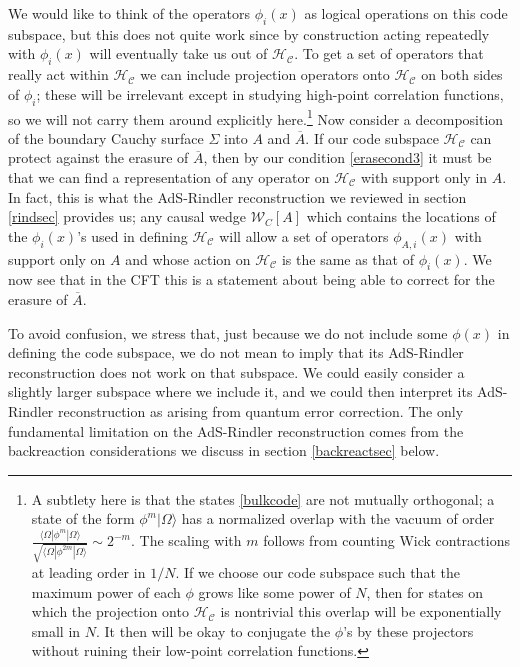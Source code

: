 \documentclass[12pt]{article}
\newcommand{\HC}{\mathcal{H}_{\mathcal{C}}}
\newcommand{\lan}{\langle}
\newcommand{\ran}{\rangle}
\newcommand{\W}{\mathcal{W}}
\newcommand{\ol}{\overline}
\begin{document}
We would like to think of the operators $\phi_i(x)$ as logical operations on this code subspace, but this does not quite work since by construction acting repeatedly with $\phi_i(x)$ will eventually take us out of $\HC$.  To get a set of operators that really act within $\HC$ we can include projection operators onto $\HC$ on both sides of $\phi_i$; these will be irrelevant except in studying high-point correlation functions, so we will not carry them around explicitly here.\footnote{A subtlety here is that the states \eqref{bulkcode} are not mutually orthogonal; a state of the form $\phi^m|\Omega\ran$ has a normalized overlap with the vacuum of order $\frac{\lan\Omega|\phi^m|\Omega\ran}{\sqrt{\lan\Omega|\phi^{2m}|\Omega\ran}}\sim 2^{-m}$.  The scaling with $m$ follows from counting Wick contractions at leading order in $1/N$.  If we choose our code subspace such that the maximum power of each $\phi$ grows like some power of $N$, then for states on which the projection onto $\HC$ is nontrivial this overlap will be exponentially small in $N$.  It then will be okay to conjugate the $\phi$'s by these projectors without ruining their low-point correlation functions.}  Now consider a decomposition of the boundary Cauchy surface $\Sigma$ into $A$ and $\ol{A}$.  If our code subspace $\HC$ can protect against the erasure of $\ol{A}$, then by our condition \eqref{erasecond3} it must be that we can find a representation of any operator on $\HC$ with support only in $A$.  In fact, this is what the AdS-Rindler reconstruction we reviewed in section \ref{rindsec} provides us; any causal wedge $\W_C[A]$ which contains the locations of the $\phi_i(x)$'s used in defining $\HC$ will allow a set of operators $\phi_{A,i}(x)$ with support only on $A$ and whose action on $\HC$ is the same as that of $\phi_{i}(x)$.  We now see that in the CFT this is a statement about being able to correct for the erasure of $\overline{A}$.

To avoid confusion, we stress that, just because we do not include some $\phi(x)$ in defining the code subspace, we do not mean to imply that its AdS-Rindler reconstruction does not work on that subspace.  We could easily consider a slightly larger subspace where we include it, and we could then interpret its AdS-Rindler reconstruction as arising from quantum error correction.  The only fundamental limitation on the AdS-Rindler reconstruction comes from the backreaction considerations we discuss in section \ref{backreactsec} below.
\end{document}
